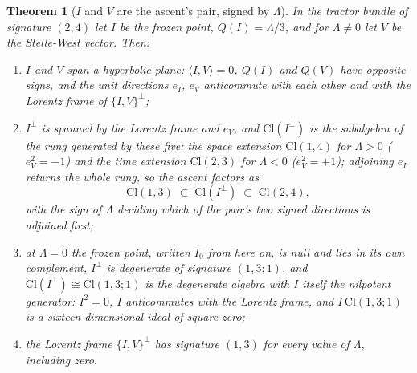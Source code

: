 \documentclass[11pt]{article}
\newtheorem{theorem}{Theorem}[section]
\theoremstyle{definition}
\theoremstyle{plain}
\newcommand{\changedmark}[2]{\marginpar{\raggedright\scriptsize\color{#1}#2}}
\providecommand{\Cl}{}\renewcommand{\Cl}{\mathrm{Cl}}
\providecommand{\ip}{}\renewcommand{\ip}[2]{\langle #1, #2\rangle}
\begin{document}
\begin{theorem}[$I$ and $V$ are the ascent's pair, signed by $\Lambda$]\label{c:odd-extensions.are-ascents-pair-signed}
\changedmark{gray}{reworded}
In the tractor bundle of signature $(2,4)$ let $I$ be the frozen point, $Q(I) = \Lambda/3$, and for $\Lambda \neq 0$ let $V$ be the Stelle-West vector. Then:
\begin{enumerate}
\item[(i)] $I$ and $V$ span a hyperbolic plane: $\ip{I}{V} = 0$, $Q(I)$ and $Q(V)$ have opposite signs, and the unit directions $e_{I}$, $e_{V}$ anticommute with each other and with the Lorentz frame of $\{I,V\}^{\perp}$;
\item[(ii)] $I^{\perp}$ is spanned by the Lorentz frame and $e_{V}$, and $\Cl(I^{\perp})$ is the subalgebra of the rung generated by these five: the space extension $\Cl(1,4)$ for $\Lambda > 0$ ($e_{V}^{2} = -1$) and the time extension $\Cl(2,3)$ for $\Lambda < 0$ ($e_{V}^{2} = +1$); adjoining $e_{I}$ returns the whole rung, so the ascent factors as
\[
\Cl(1,3) \;\subset\; \Cl(I^{\perp}) \;\subset\; \Cl(2,4),
\]
with the sign of $\Lambda$ deciding which of the pair's two signed directions is adjoined first;
\item[(iii)] at $\Lambda = 0$ the frozen point, written $I_{0}$ from here on, is null and lies in its own complement, $I^{\perp}$ is degenerate of signature $(1,3;1)$, and $\Cl(I^{\perp}) \cong \Cl(1,3;1)$ is the degenerate algebra with $I$ itself the nilpotent generator: $I^{2} = 0$, $I$ anticommutes with the Lorentz frame, and $I\,\Cl(1,3;1)$ is a sixteen-dimensional ideal of square zero;
\item[(iv)] the Lorentz frame $\{I,V\}^{\perp}$ has signature $(1,3)$ for every value of $\Lambda$, including zero.
\end{enumerate}
\end{theorem}
\end{document}
